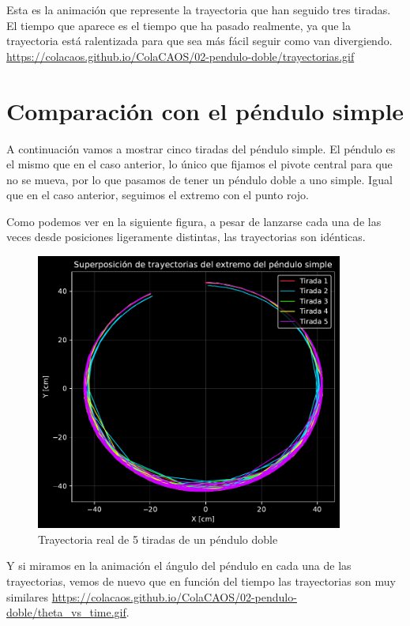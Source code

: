 \documentclass[
  10pt,
  a4paper,
  DIV=11,
  numbers=noendperiod,
  open=any]{scrreprt}
\numberwithin{equation}{chapter}
\numberwithin{equation}{section}
\renewcommand{\[}{\begin{equation}}
\renewcommand{\]}{\end{equation}}
\begin{document}
Esta es la animación que represente la trayectoria que han seguido tres
tiradas. El tiempo que aparece es el tiempo que ha pasado realmente, ya
que la trayectoria está ralentizada para que sea más fácil seguir como
van divergiendo.  \url{https://colacaos.github.io/ColaCAOS/02-pendulo-doble/trayectorias.gif}



\section{Comparación con el péndulo
simple}\label{comparaciuxf3n-con-el-puxe9ndulo-simple}

A continuación vamos a mostrar cinco tiradas del péndulo simple. El
péndulo es el mismo que en el caso anterior, lo único que fijamos el
pivote central para que no se mueva, por lo que pasamos de tener un
péndulo doble a uno simple. Igual que en el caso anterior, seguimos el
extremo con el punto rojo.

Como podemos ver en la siguiente figura, a pesar de lanzarse cada una de
las veces desde posiciones ligeramente distintas, las trayectorias son
idénticas.

\begin{figure}[h]
  \centering
  \includegraphics[width=0.9\textwidth]{02-pendulo-doble/experimentos_files/figure-pdf/cell-3-output-1.pdf}
  \caption{Trayectoria real de 5 tiradas de un péndulo doble}
\end{figure}

Y si miramos en la animación el ángulo del péndulo en cada una de las
trayectorias, vemos de nuevo que en función del tiempo las trayectorias
son muy similares \url{https://colacaos.github.io/ColaCAOS/02-pendulo-doble/theta_vs_time.gif}.
\end{document}
